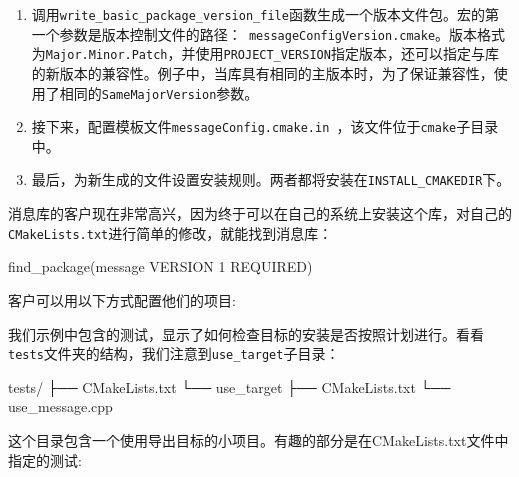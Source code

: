 \begin{enumerate}
\item 调用\texttt{write\_basic\_package\_version\_file}函数生成一个版本文件包。宏的第一个参数是版本控制文件的路径：\texttt{ messageConfigVersion.cmake}。版本格式为\texttt{Major.Minor.Patch}，并使用\texttt{PROJECT\_VERSION}指定版本，还可以指定与库的新版本的兼容性。例子中，当库具有相同的主版本时，为了保证兼容性，使用了相同的\texttt{SameMajorVersion}参数。

\item 接下来，配置模板文件\texttt{messageConfig.cmake.in }，该文件位于\texttt{cmake}子目录中。

\item 最后，为新生成的文件设置安装规则。两者都将安装在\texttt{INSTALL\_CMAKEDIR}下。

\end{enumerate}


消息库的客户现在非常高兴，因为终于可以在自己的系统上安装这个库，对自己的\texttt{CMakeLists.txt}进行简单的修改，就能找到消息库：

\begin{codebox}[cmake]
find_package(message VERSION 1 REQUIRED)
\end{codebox}

客户可以用以下方式配置他们的项目:


我们示例中包含的测试，显示了如何检查目标的安装是否按照计划进行。看看\texttt{tests}文件夹的结构，我们注意到\texttt{use\_target}子目录：

\begin{codebox}[shell]
tests/
├── CMakeLists.txt
└── use_target
    ├── CMakeLists.txt
    └── use_message.cpp
\end{codebox}

这个目录包含一个使用导出目标的小项目。有趣的部分是在CMakeLists.txt文件中指定的测试:

